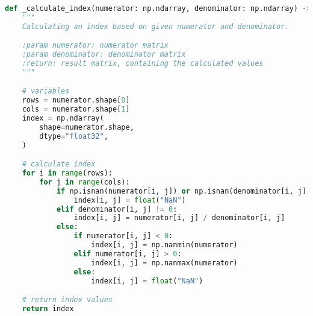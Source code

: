 \begin{lstlisting}[language={Python}]
def _calculate_index(numerator: np.ndarray, denominator: np.ndarray) -> np.ndarray:
    """
    Calculating an index based on given numerator and denominator.

    :param numerator: numerator matrix
    :param denominator: denominator matrix
    :return: result matrix, containing the calculated values
    """

    # variables
    rows = numerator.shape[0]
    cols = numerator.shape[1]
    index = np.ndarray(
        shape=numerator.shape,
        dtype="float32",
    )

    # calculate index
    for i in range(rows):
        for j in range(cols):
            if np.isnan(numerator[i, j]) or np.isnan(denominator[i, j]):
                index[i, j] = float("NaN")
            elif denominator[i, j] != 0:
                index[i, j] = numerator[i, j] / denominator[i, j]
            else:
                if numerator[i, j] < 0:
                    index[i, j] = np.nanmin(numerator)
                elif numerator[i, j] > 0:
                    index[i, j] = np.nanmax(numerator)
                else:
                    index[i, j] = float("NaN")

    # return index values
    return index
\end{lstlisting}


